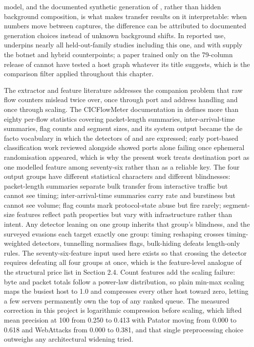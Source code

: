 model, and the documented synthetic generation of \cite{k8}, rather than hidden background composition, is what makes transfer results on it interpretable: when numbers move between captures, the difference can be attributed to documented generation choices instead of unknown background shifts. In reported use, \cite{k5} underpins nearly all held-out-family studies including this one, and \cite{k7} with \cite{k8} supply the botnet and hybrid counterpoints; a paper trained only on the 79-column release of \cite{k5} cannot have tested a host graph whatever its title suggests, which is the comparison filter applied throughout this chapter.

The extractor and feature literature addresses the companion problem that raw flow counters mislead twice over, once through port and address handling and once through scaling. The CICFlowMeter documentation in \cite{k9} defines more than eighty per-flow statistics covering packet-length summaries, inter-arrival-time summaries, flag counts and segment sizes, and its system output became the de facto vocabulary in which the detectors of \cite{k5} and \cite{k8} are expressed; early port-based classification work reviewed alongside \cite{k9} showed ports alone failing once ephemeral randomisation appeared, which is why the present work treats destination port as one modelled feature among seventy-six rather than as a reliable key. The four output groups have different statistical characters and different blindnesses: packet-length summaries separate bulk transfer from interactive traffic but cannot see timing; inter-arrival-time summaries carry rate and burstiness but cannot see volume; flag counts mark protocol-state abuse but fire rarely; segment-size features reflect path properties but vary with infrastructure rather than intent. Any detector leaning on one group inherits that group's blindness, and the surveyed evasions each target exactly one group: timing reshaping crosses timing-weighted detectors, tunnelling normalises flags, bulk-hiding defeats length-only rules. The seventy-six-feature input used here exists so that crossing the detector requires defeating all four groups at once, which is the feature-level analogue of the structural price list in Section 2.4. Count features add the scaling failure: byte and packet totals follow a power-law distribution, so plain min-max scaling maps the busiest host to 1.0 and compresses every other host toward zero, letting a few servers permanently own the top of any ranked queue. The measured correction in this project is logarithmic compression before scaling, which lifted mean precision at 100 from 0.250 to 0.413 with Patator moving from 0.000 to 0.618 and WebAttacks from 0.000 to 0.381, and that single preprocessing choice outweighs any architectural widening tried.

